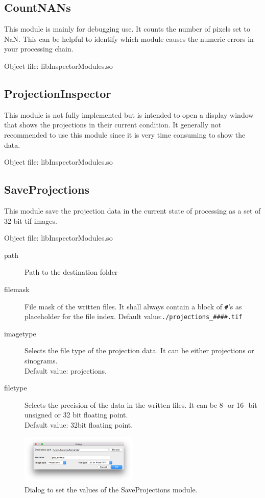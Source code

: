 \documentclass[a4paper]{scrreprt}
\begin{document}
\subsection{CountNANs}
This module is mainly for debugging use. It counts the number of pixels set to NaN. This can be helpful to identify which module causes the numeric errors in your processing chain.

Object file: libInspectorModules.so

\subsection{ProjectionInspector}
This module is not fully implemented but is intended to open a display window that shows the projections in their current condition. It generally not recommended to use this module since it is very time consuming to show the data.

Object file: libInspectorModules.so

\subsection{SaveProjections}
This module save the projection data in the current state of processing as a set of 32-bit tif images.

Object file: libInspectorModules.so
\begin{description}
\item[path] Path to the destination folder 
\item[filemask] File mask of the written files. It shall always contain a block of \verb+#+'s as placeholder for the file index. Default value:\verb+./projections_####.tif+
\item[imagetype] Selects the file type of the projection data. It can be either projections or sinograms. \\Default value: projections.
\item[filetype] Selects the precision of the data in the written files. It can be 8- or 16- bit unsigned or 32 bit floating point.\\Default value: 32bit floating point.
\end{description}
\begin{figure}[ht!]
\centering
\includegraphics[width=0.5\textwidth]{figures/SaveProjectionsDlg.png}
\caption{Dialog to set the values of the SaveProjections module.}
\end{figure}
\end{document}
